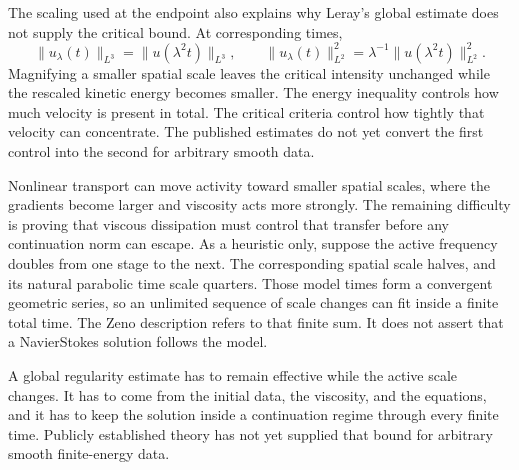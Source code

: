 
The scaling used at the endpoint also explains why Leray's global estimate does not supply the critical bound.
At corresponding times,
\[
  \lVert u_\lambda(t)\rVert_{L^3}
  =
  \lVert u(\lambda^2t)\rVert_{L^3},
  \qquad
  \lVert u_\lambda(t)\rVert_{L^2}^{2}
  =
  \lambda^{-1}\lVert u(\lambda^2t)\rVert_{L^2}^{2}.
\]
Magnifying a smaller spatial scale leaves the critical intensity unchanged while the rescaled kinetic energy becomes smaller.
The energy inequality controls how much velocity is present in total.
The critical criteria control how tightly that velocity can concentrate.
The published estimates do not yet convert the first control into the second for arbitrary smooth data.

Nonlinear transport can move activity toward smaller spatial scales, where the gradients become larger and viscosity acts more strongly.
The remaining difficulty is proving that viscous dissipation must control that transfer before any continuation norm can escape.
As a heuristic only, suppose the active frequency doubles from one stage to the next.
The corresponding spatial scale halves, and its natural parabolic time scale quarters.
Those model times form a convergent geometric series, so an unlimited sequence of scale changes can fit inside a finite total time.
The Zeno description refers to that finite sum.
It does not assert that a Navier\textendash Stokes solution follows the model.

A global regularity estimate has to remain effective while the active scale changes.
It has to come from the initial data, the viscosity, and the equations, and it has to keep the solution inside a continuation regime through every finite time.
Publicly established theory has not yet supplied that bound for arbitrary smooth finite-energy data.
